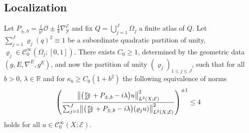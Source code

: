 \documentclass[10pt]{amsart}
\theoremstyle{definition}\newtheorem{defi}[theo]{Definition}\newtheorem{rema}[theo]{Remark}\newtheorem{exam}[theo]{Example}\newtheorem{exem}[theo]{Example}\newtheorem{nota}[theo]{Notation}
\newcommand{\R}{\mathbb{R}}
\newcommand{\clC}{\mathcal{C}}
\newcommand{\clY}{\mathcal{Y}}
\newcommand{\clO}{\mathcal{O}}
\newcommand{\clE}{\mathcal{E}}
\newcommand\norm[1]{\left\lVert#1\right\rVert}
\let\originalleft\left
\let\originalright\right
\renewcommand{\left}{\mathopen{}\mathclose\bgroup\originalleft}
\renewcommand{\right}{\aftergroup\egroup\originalright}
\begin{document}
\subsection{Localization}\label{sec:partunitPb}
\begin{prop}\label{pr:equivalence}
Let $P_{\pm,b}=\frac{1}{b^{2}}\clO\pm\frac{1}{b}\nabla^{\clE}_{\clY}$ and fix $Q=\bigcup_{j=1}^{J}\Omega_{j}$ a finite atlas of $Q$. Let $\sum_{j=1}^{J}\varrho_{j}(q)^{2}\equiv 1$ be a subordinate quadratic partition of unity, $\varrho_{j}\in \clC^{\infty}_{0}(\Omega_{j};[0,1])$. There exists $C_{0}\geq 1$, determined by the geometric data $(g,E,\nabla^{E},g^{E})$, and now the partition of unity $(\varrho_{j})_{1\leq j\leq J}$, such that for all $b>0$, $\lambda\in \R$ and for $\kappa_{b}\geq C_{0}(1+b^{2})$ the following equivalence of norms
\begin{equation}\label{eq:equivalence}
\left(
\frac{\norm{\left(\frac{\kappa_{b}}{b^{2}}+P_{\pm,b}-i\lambda\right)u}^{2}_{L^{2}(X;\clE)}} {\sum_{j=1}^{J}\norm{\left(\frac{\kappa_{b}}{b^{2}}+P_{\pm,b}-i\lambda\right)\left(\varrho_{j}u\right)}^{2}_{L^{2}(X;\clE)}}
\right)^{\pm 1}\leq 4
\end{equation}
holds for all $ u\in \clC^{\infty}_{0}(X;\clE)$.
\end{prop}
\end{document}
